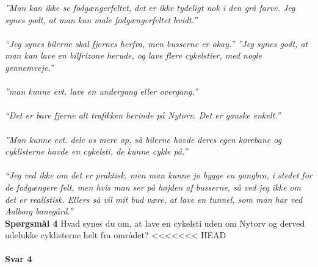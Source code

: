   \emph{”Man kan ikke se fodgængerfeltet, det er ikke tydeligt nok i den grå farve. Jeg synes godt, at man kan male fodgængerfeltet hvidt.”
\\\\
  “Jeg synes bilerne skal fjernes herfra, men busserne er okay.”
  ”Jeg synes godt, at man kan lave en bilfrizone herude, og lave flere cykelstier, med nogle gennemveje.”
\\\\

  ”man kunne evt. lave en undergang eller overgang.”
\\\\
  “Det er bare fjerne alt trafikken herinde på Nytorv. Det er ganske enkelt.”
\\\\
  ”Man kunne evt. dele os mere op, så bilerne havde deres egen kørebane og cyklisterne havde en cykelsti, de kunne cykle på.”
\\\\
  “Jeg ved ikke om det er praktisk, men man kunne jo bygge en gangbro, i stedet for de fodgængere felt, men hvis man ser på højden af busserne, så ved jeg ikke om det er realistisk. Ellers så vil mit bud være, at lave en tunnel, som man har ved Aalborg banegård.”}
\\
\textbf{Spørgsmål 4}
Hvad synes du om, at lave en cykelsti uden om Nytorv og derved udelukke cyklisterne helt fra området?
<<<<<<< HEAD
\\\\
\textbf{Svar 4}
